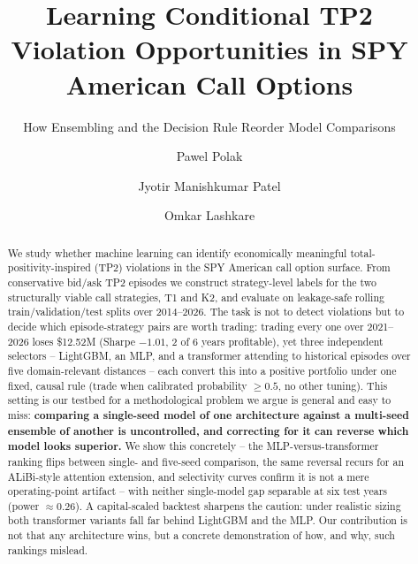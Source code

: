 \documentclass[sigconf,review]{acmart}
\begin{document}
\title{Learning Conditional TP2 Violation Opportunities in SPY American Call Options}
\subtitle{How Ensembling and the Decision Rule Reorder Model Comparisons}

\author{Pawel Polak}

\author{Jyotir Manishkumar Patel}

\author{Omkar Lashkare}

\renewcommand{\shortauthors}{Polak, Patel, Lashkare}

\begin{abstract}
We study whether machine learning can identify economically meaningful total-positivity-inspired (TP2) violations in the SPY American call option surface. From conservative bid/ask TP2 episodes we construct strategy-level labels for the two structurally viable call strategies, T1 and K2, and evaluate on leakage-safe rolling train/validation/test splits over 2014--2026. The task is not to detect violations but to decide which episode-strategy pairs are worth trading: trading every one over 2021--2026 loses \$12.52M (Sharpe $-1.01$, 2 of 6 years profitable), yet three independent selectors -- LightGBM, an MLP, and a transformer attending to historical episodes over five domain-relevant distances -- each convert this into a positive portfolio under one fixed, causal rule (trade when calibrated probability $\ge 0.5$, no other tuning). This setting is our testbed for a methodological problem we argue is general and easy to miss: \textbf{comparing a single-seed model of one architecture against a multi-seed ensemble of another is uncontrolled, and correcting for it can reverse which model looks superior.} We show this concretely -- the MLP-versus-transformer ranking flips between single- and five-seed comparison, the same reversal recurs for an ALiBi-style attention extension, and selectivity curves confirm it is not a mere operating-point artifact -- with neither single-model gap separable at six test years (power $\approx0.26$). A capital-scaled backtest sharpens the caution: under realistic sizing both transformer variants fall far behind LightGBM and the MLP. Our contribution is not that any architecture wins, but a concrete demonstration of how, and why, such rankings mislead.
\end{abstract}
\end{document}
